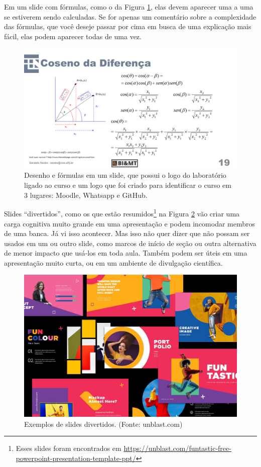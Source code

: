 Em um slide com fórmulas, como o da Figura \ref{fig:formulas}, elas devem aparecer uma a uma se estiverem sendo calculadas. Se for apenas um comentário sobre a complexidade das fórmulas, que você deseje passar por cima em busca de uma explicação mais fácil, elas podem aparecer todas de uma vez.

\begin{figure}[hbt]
    \centering
    \includegraphics[width=\tam\linewidth,frame]{imagens/desenhoeformulas.png}
    \caption{Desenho e fórmulas em um slide, que possui o logo do laboratório ligado ao curso e um logo que foi criado para identificar o curso em 3 lugares: Moodle, Whatsapp e GitHub.}
    \label{fig:formulas}
\end{figure}



Slides ``divertidos'', como os que estão resumidos\footnote{Esses slides foram encontrados em     \url{https://unblast.com/funtastic-free-powerpoint-presentation-template-ppt/}
} na Figura \ref{fig:fun} vão criar uma carga cognitiva muito grande em uma apresentação e podem incomodar membros de uma banca. Já vi isso acontecer. Mas isso não quer dizer que não possam ser usados em um ou outro slide, como marcos de início de seção ou outra alternativa de menor impacto que usá-los em toda aula. Também podem ser úteis em uma apresentação muito curta, ou em um ambiente de divulgação científica.

\begin{figure}[hbt]
    \centering
    \includegraphics[width=\tam\linewidth,frame]{imagens/funslide.jpg}
    \caption{Exemplos de slides divertidos.
        (Fonte: unblast.com) }
    \label{fig:fun}
\end{figure}

